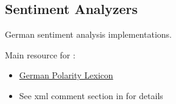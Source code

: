 \documentclass[letterpaper,10pt,english]{sphinxmanual}
\begin{document}
\subsection{Sentiment Analyzers}
\label{api_reference:module-textblob_de.sentiments}\label{api_reference:sentiment-analyzers}
German sentiment analysis implementations.

Main resource for :
\begin{itemize}
\item {} 
\href{http://bics.sentimental.li/index.php/downloads}{German Polarity Lexicon}

\item {} 
See xml comment section in  for details

\end{itemize}
\end{document}
